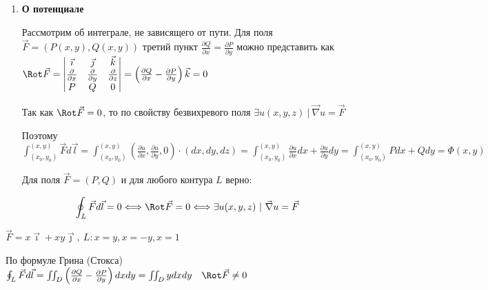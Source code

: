 \documentclass[12pt]{article}
\begin{document}
\begin{enumerate}[label*=\textbf{\arabic**} ]
\begin{MyTheorem}
            \[\oint_L \vec{F}d\vec{l} = \iint_S \Rot \vec{F} d\vec{\sigma}\]
        \end{MyTheorem}

        \mediumvspace

        \hypertarget{theoremaboutpotentialinvectorform}{}

        \item \textbf{\Ths О потенциале}

        Рассмотрим \Ths об интеграле, не зависящего от пути. Для поля $\vec F = (P(x, y), Q(x, y))$ третий пункт $\frac{\partial Q}{\partial x} = \frac{\partial P}{\partial y}$ можно представить как $\Rot \vec F = 
        \begin{vmatrix}
            \vec\imath & \vec\jmath & \vec k \\
            \frac{\partial}{\partial x} & \frac{\partial}{\partial y} & \frac{\partial}{\partial z} \\
            P & Q & 0
        \end{vmatrix} = \left(\frac{\partial Q}{\partial x} - \frac{\partial P}{\partial y}\right) \vec k = 0$

        Так как $\Rot \vec F = 0$, то по свойству безвихревого поля $\exists u(x, y, z) \ | \ \vec\nabla u = \vec F$

        Поэтому $\int_{(x_0, y_0)}^{(x, y)} \vec{F}d\vec{l} =  \int_{(x_0, y_0)}^{(x, y)} \left(\frac{\partial u}{\partial x}, \frac{\partial u}{\partial y}, 0\right) \cdot (dx, dy, dz) = \int_{(x_0, y_0)}^{(x, y)} \frac{\partial u}{\partial x} dx + \frac{\partial u}{\partial y} dy = \int_{(x_0, y_0)}^{(x, y)} Pdx + Qdy = \Phi(x, y)$

        \begin{MyTheorem}
             Для поля $\vec F = (P, Q)$ и для любого контура $L$ верно:

            \[\oint_L \vec{F}d\vec{l} = 0 \Longleftrightarrow \Rot \vec{F} = 0 \Longleftrightarrow \exists u(x, y, z) \ | \ \vec\nabla u = \vec{F}\]
        \end{MyTheorem}

    \end{enumerate}

    \Ex $\vec{F} = x\vec\imath + xy \vec\jmath, \ L: x = y, x = -y, x = 1$

    По формуле Грина (Стокса) $\oint_L \vec{F} d\vec{l} = \iint_{D} \left(\frac{\partial Q}{\partial x} - \frac{\partial P}{\partial y}\right) dxdy =
    \iint_D y dxdy \quad \Rot \vec{F} \neq 0$
\end{document}
